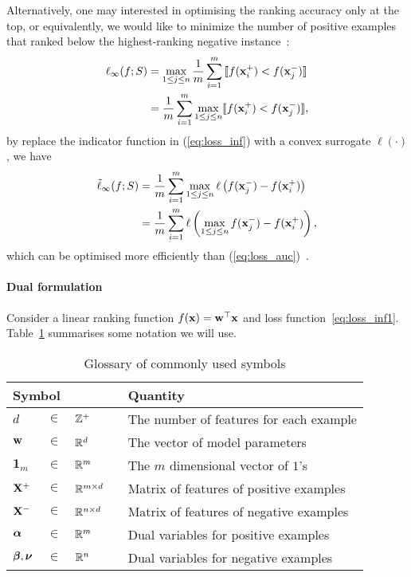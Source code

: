 Alternatively, one may interested in optimising the ranking accuracy only at the top, 
or equivalently, we would like to minimize the number of positive examples that ranked below the highest-ranking negative instance~\cite{agarwal:2011,li:2014}:
\begin{equation}
\label{eq:loss_inf}
\begin{aligned}
\ell_{\infty}(f; S) 
&= \max_{1 \le j \le n} \frac{1}{m} \sum_{i=1}^m \, \llbracket f(\mathbf{x}_i^+) < f(\mathbf{x}_j^-) \rrbracket \\
&= \frac{1}{m} \sum_{i=1}^m \max_{1 \le j \le n} \llbracket f(\mathbf{x}_i^+) < f(\mathbf{x}_j^-) \rrbracket,
\end{aligned}
\end{equation}
by replace the indicator function in (\ref{eq:loss_inf}) with a convex surrogate $\ell(\cdot)$, we have
\begin{equation}
\label{eq:loss_inf1} 
\begin{aligned}
\tilde{\ell}_{\infty}(f; S) 
&= \frac{1}{m} \sum_{i=1}^m \max_{1 \le j \le n} \ell\left( f(\mathbf{x}_j^-) - f(\mathbf{x}_i^+) \right) \\
&= \frac{1}{m} \sum_{i=1}^m \ell\left( \max_{1 \le j \le n} f(\mathbf{x}_j^-) - f(\mathbf{x}_i^+) \right),
\end{aligned}
\end{equation}
which can be optimised more efficiently than (\ref{eq:loss_auc})~\cite{li:2014}.

\paragraph{Dual formulation}
Consider a linear ranking function $f(\mathbf{x}) = \mathbf{w}^\top \mathbf{x}$ and loss function~\ref{eq:loss_inf1}.
Table~\ref{tab:symbol} summarises some notation we will use.
\begin{table}[!h]
\caption{Glossary of commonly used symbols}
\label{tab:symbol}
\renewcommand{\arraystretch}{1.5} %
\setlength{\tabcolsep}{1pt} %
\centering
\begin{tabular}{llll}
\hline \hline
\multicolumn{3}{l}{\textbf{Symbol}} & \textbf{Quantity} \\ \hline 
$d$              &  $\in$  &  $\mathbb{Z}^+$  & The number of features for each example \\
$\mathbf{w}$             &  $\in$  &  $\mathbb{R}^d$  & The vector of model parameters \\
$\mathbf{1}_m$   &  $\in$  &  $\mathbb{R}^m$  & The $m$ dimensional vector of $1$'s \\
$\mathbf{X}^+$           &  $\in$  &  $\mathbb{R}^{m \times d}\quad$  & Matrix of features of positive examples \\
$\mathbf{X}^-$           &  $\in$  &  $\mathbb{R}^{n \times d}$       & Matrix of features of negative examples \\
$\bm{\alpha}$       &  $\in$  &  $\mathbb{R}^m$  &  Dual variables for positive examples \\
$\bm{\beta}, \bm{\nu}$ &  $\in$  &  $\mathbb{R}^n$  &  Dual variables for negative examples \\ \hline
\end{tabular}
\end{table}

